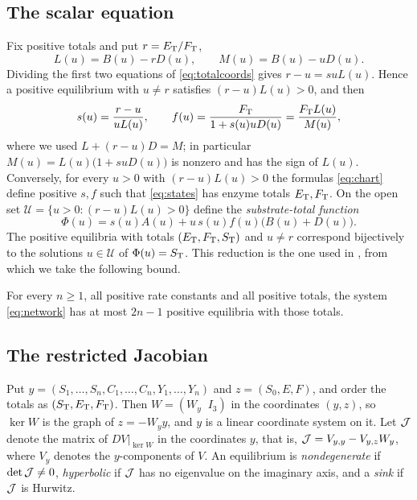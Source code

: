 \subsection{The scalar equation}
Fix positive totals and put \(r=E_{\mathrm T}/F_{\mathrm T}\),
\begin{equation}\label{eq:LM}
 L(u)=B(u)-rD(u),\qquad M(u)=B(u)-uD(u).
\end{equation}
Dividing the first two equations of \eqref{eq:totalcoords} gives \(r-u=suL(u)\). Hence a
positive equilibrium with \(u\ne r\) satisfies \((r-u)L(u)>0\), and then
\begin{equation}\label{eq:chart}
 s(u)=\frac{r-u}{uL(u)},\qquad
 f(u)=\frac{F_{\mathrm T}}{1+s(u)uD(u)}=\frac{F_{\mathrm T} L(u)}{M(u)},
\end{equation}
where we used \(L+(r-u)D=M\); in particular \(M(u)=L(u)\bigl(1+suD(u)\bigr)\) is nonzero and
has the sign of \(L(u)\). Conversely, for every \(u>0\) with \((r-u)L(u)>0\) the formulas
\eqref{eq:chart} define positive \(s,f\) such that \eqref{eq:states} has enzyme totals
\(E_{\mathrm T},F_{\mathrm T}\). On the open set \(\mathcal U=\{u>0:(r-u)L(u)>0\}\) define the
\emph{substrate-total function}
\begin{equation}\label{eq:H}
 \Phi(u)=s(u)A(u)+u\,s(u)f(u)\bigl(B(u)+D(u)\bigr).
\end{equation}
The positive equilibria with totals \((E_{\mathrm T},F_{\mathrm T},S_{\mathrm T})\) and \(u\ne r\) correspond bijectively to
the solutions \(u\in\mathcal U\) of \(\Phi(u)=S_{\mathrm T}\). This reduction is the one used in
\cite{WangSontag2008}, from which we take the following bound.

\begin{theorem}\label{thm:WS}
For every \(n\ge1\), all positive rate constants and all positive totals, the system
\eqref{eq:network} has at most \(2n-1\) positive equilibria with those totals.
\end{theorem}

\subsection{The restricted Jacobian}
Put \(y=(S_1,\dots,S_n,C_1,\dots,C_n,Y_1,\dots,Y_n)\) and \(z=(S_0,E,F)\), and order the totals
as \((S_{\mathrm T},E_{\mathrm T},F_{\mathrm T})\). Then \(W=(W_y\;\;I_3)\) in the coordinates \((y,z)\), so \(\ker W\) is
the graph of \(z=-W_yy\), and \(y\) is a linear coordinate system on it. Let \(\mathcal J\) denote the
matrix of \(DV|_{\ker W}\) in the coordinates \(y\), that is, \(\mathcal J=V_{y,y}-V_{y,z}W_y\), where
\(V_y\) denotes the \(y\)-components of \(V\). An equilibrium is \emph{nondegenerate} if
\(\det\mathcal J\ne0\), \emph{hyperbolic} if \(\mathcal J\) has no eigenvalue on the imaginary axis, and a
\emph{sink} if \(\mathcal J\) is Hurwitz.

